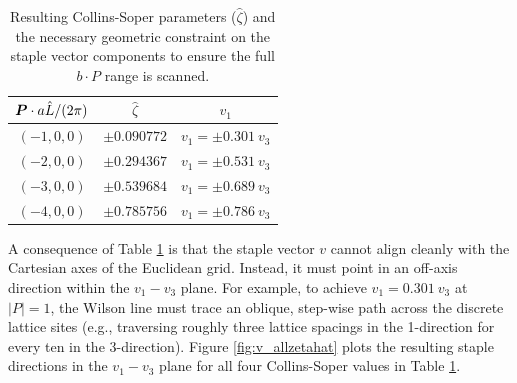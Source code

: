 \begin{table}[tb]
    \centering
    \renewcommand{\arraystretch}{1.3}
    \begin{tabular}{|c|c|c|}
    \hline
        $\boldsymbol{P}\cdot a\hat{L}/(2\pi)$ & $\hat{\zeta}$ &  $v_{1}$\\
        \hline
        $(-1,0,0)$ & $\pm 0.090772$ &$v_{1}=\pm 0.301~v_{3}$\\
        \hline
        $(-2,0,0)$ & $\pm 0.294367$ &$v_{1}=\pm 0.531~v_{3}$\\
        \hline
        $(-3,0,0)$ & $\pm 0.539684$ &$v_{1}=\pm 0.689~v_{3}$\\
        \hline
        $(-4,0,0)$ & $\pm 0.785756$ &$v_{1}=\pm 0.786~v_{3}$\\
        \hline
    \end{tabular}
    \caption{Resulting Collins-Soper parameters ($\hat{\zeta}$) and the necessary geometric constraint on the staple vector components to ensure the full $b \cdot P$ range is scanned.}
    \label{tab:zeta_directions}
\end{table}

\begin{table}[tb]
    \centering
    \renewcommand{\arraystretch}{1.3}
    \caption{Configuration parameters for the Lattice QCD non-local matrix element extraction. Our lattice size is $\{\hat{L}^3\times\hat{T}\}=\{32^3\times96\}$ and the lattice spacing is $a=0.11403\text{ fm}$.}
    \label{tab:lattice_params}
\end{table}
A consequence of Table \ref{tab:zeta_directions} is that the staple vector $v$ cannot align cleanly with the Cartesian axes of the Euclidean grid. Instead, it must point in an off-axis direction within the $v_1-v_3$ plane. For example, to achieve $v_1 = 0.301~v_3$ at $|P| = 1$, the Wilson line must trace an oblique, step-wise path across the discrete lattice sites (e.g., traversing roughly three lattice spacings in the 1-direction for every ten in the 3-direction). Figure \ref{fig:v_allzetahat} plots the resulting staple directions in the $v_1-v_3$ plane for all four Collins-Soper values in Table \ref{tab:zeta_directions}.

